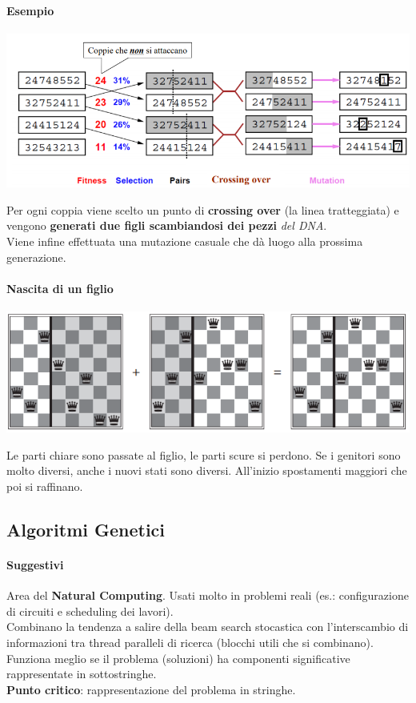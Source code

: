 \documentclass[10pt]{book}
\begin{document}
\paragraph{Esempio}
\begin{center}
	\includegraphics[scale=0.7]{alggenetic.png}
\end{center}
Per ogni coppia viene scelto un punto di \textbf{crossing over} (la linea tratteggiata) e vengono \textbf{generati due figli scambiandosi dei pezzi} \textit{del DNA}.\\
Viene infine effettuata una mutazione casuale che dà luogo alla prossima generazione.
\pagebreak
\paragraph{Nascita di un figlio}
\begin{center}
	\includegraphics[scale=0.7]{8reggeneticfigli.png}
\end{center}
Le parti chiare sono passate al figlio, le parti scure si perdono. Se i genitori sono molto diversi, anche i nuovi stati sono diversi. All'inizio spostamenti maggiori che poi si raffinano.
\subsection*{Algoritmi Genetici}
\paragraph{Suggestivi} Area del \textbf{Natural Computing}. Usati molto in problemi reali (es.: configurazione di circuiti e scheduling dei lavori).\\
Combinano la tendenza a salire della beam search stocastica con l'interscambio di informazioni tra thread paralleli di ricerca (blocchi utili che si combinano).\\
Funziona meglio se il problema (soluzioni) ha componenti significative rappresentate in sottostringhe.\\
\textbf{Punto critico}: rappresentazione del problema in stringhe.
\end{document}
